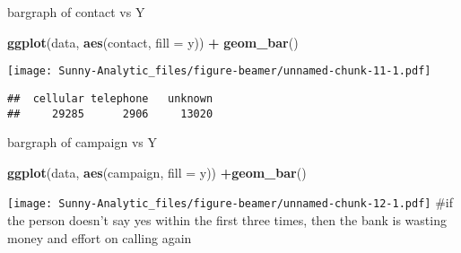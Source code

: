 \documentclass[ignorenonframetext,]{beamer}
\newenvironment{Shaded}{\begin{snugshade}}{\end{snugshade}}
\newcommand{\DataTypeTok}[1]{\textcolor[rgb]{0.13,0.29,0.53}{#1}}
\newcommand{\KeywordTok}[1]{\textcolor[rgb]{0.13,0.29,0.53}{\textbf{#1}}}
\newcommand{\NormalTok}[1]{#1}
\newcommand{\OperatorTok}[1]{\textcolor[rgb]{0.81,0.36,0.00}{\textbf{#1}}}
\newcommand{\StringTok}[1]{\textcolor[rgb]{0.31,0.60,0.02}{#1}}
\begin{document}
\begin{frame}[fragile]{bargraph of contact vs Y}
\protect\hypertarget{bargraph-of-contact-vs-y}{}

\begin{Shaded}
\begin{Highlighting}[]
\KeywordTok{ggplot}\NormalTok{(data, }\KeywordTok{aes}\NormalTok{(contact, }\DataTypeTok{fill =}\NormalTok{ y)) }\OperatorTok{+}\StringTok{ }\KeywordTok{geom_bar}\NormalTok{()}
\end{Highlighting}
\end{Shaded}

\texttt{[image: Sunny-Analytic\_files/figure-beamer/unnamed-chunk-11-1.pdf]}

\begin{Shaded}
\end{Shaded}

\begin{verbatim}
##  cellular telephone   unknown 
##     29285      2906     13020
\end{verbatim}

\end{frame}

\begin{frame}[fragile]{bargraph of campaign vs Y}
\protect\hypertarget{bargraph-of-campaign-vs-y}{}

\begin{Shaded}
\begin{Highlighting}[]
\KeywordTok{ggplot}\NormalTok{(data, }\KeywordTok{aes}\NormalTok{(campaign, }\DataTypeTok{fill =}\NormalTok{ y)) }\OperatorTok{+}\KeywordTok{geom_bar}\NormalTok{()}
\end{Highlighting}
\end{Shaded}

\texttt{[image: Sunny-Analytic\_files/figure-beamer/unnamed-chunk-12-1.pdf]}
\#if the person doesn't say yes within the first three times, then the
bank is wasting money and effort on calling again

\end{frame}
\end{document}
